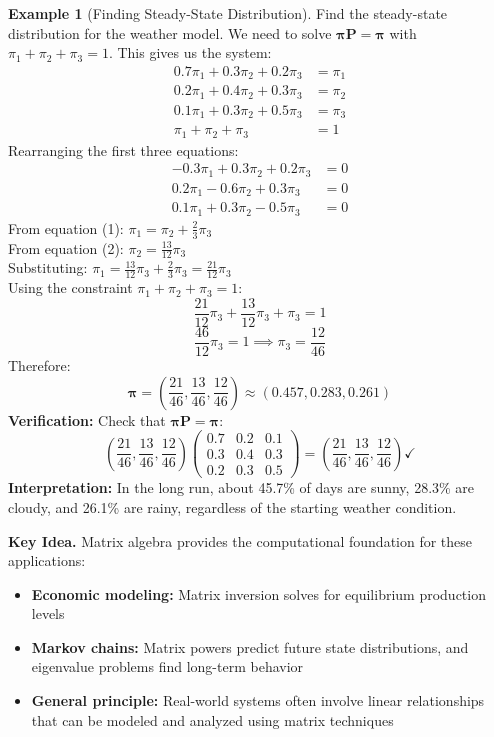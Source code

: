 \documentclass[12pt]{article}
\numberwithin{equation}{section}
\newcommand{\vect}[1]{\boldsymbol{#1}}   %
\newcommand{\mat}[1]{\mathbf{#1}}        %
\theoremstyle{plain}
\theoremstyle{definition}
\newtheorem{example}[theorem]{Example}
\theoremstyle{remark}
\newenvironment{keyidea}{\begin{tcolorbox}\textbf{Key Idea.}}{\end{tcolorbox}}
\begin{document}
\begin{example}[Finding Steady-State Distribution]
Find the steady-state distribution for the weather model.
We need to solve $\vect{\pi}\mat{P} = \vect{\pi}$ with $\pi_1 + \pi_2 + \pi_3 = 1$.
This gives us the system:
\begin{align}
0.7\pi_1 + 0.3\pi_2 + 0.2\pi_3 &= \pi_1\\
0.2\pi_1 + 0.4\pi_2 + 0.3\pi_3 &= \pi_2\\
0.1\pi_1 + 0.3\pi_2 + 0.5\pi_3 &= \pi_3\\
\pi_1 + \pi_2 + \pi_3 &= 1
\end{align}
Rearranging the first three equations:
\begin{align}
-0.3\pi_1 + 0.3\pi_2 + 0.2\pi_3 &= 0\\
0.2\pi_1 - 0.6\pi_2 + 0.3\pi_3 &= 0\\
0.1\pi_1 + 0.3\pi_2 - 0.5\pi_3 &= 0
\end{align}
From equation (1): $\pi_1 = \pi_2 + \frac{2}{3}\pi_3$\\
From equation (2): $\pi_2 = \frac{13}{12}\pi_3$\\
Substituting: $\pi_1 = \frac{13}{12}\pi_3 + \frac{2}{3}\pi_3 = \frac{21}{12}\pi_3$\\
Using the constraint $\pi_1 + \pi_2 + \pi_3 = 1$:
$$\frac{21}{12}\pi_3 + \frac{13}{12}\pi_3 + \pi_3 = 1$$
$$\frac{46}{12}\pi_3 = 1 \implies \pi_3 = \frac{12}{46}$$
Therefore:
$$\vect{\pi} = \left(\frac{21}{46}, \frac{13}{46}, \frac{12}{46}\right) \approx (0.457, 0.283, 0.261)$$
\textbf{Verification:} Check that $\vect{\pi}\mat{P} = \vect{\pi}$:
$$\left(\frac{21}{46}, \frac{13}{46}, \frac{12}{46}\right) \begin{pmatrix}
0.7 & 0.2 & 0.1 \\
0.3 & 0.4 & 0.3 \\
0.2 & 0.3 & 0.5
\end{pmatrix} = \left(\frac{21}{46}, \frac{13}{46}, \frac{12}{46}\right) \checkmark$$
\textbf{Interpretation:} In the long run, about 45.7\% of days are sunny, 28.3\% are cloudy, and 26.1\% are rainy, regardless of the starting weather condition.
\end{example}

\begin{keyidea}
Matrix algebra provides the computational foundation for these applications:
\begin{itemize}
\item \textbf{Economic modeling:} Matrix inversion solves for equilibrium production levels
\item \textbf{Markov chains:} Matrix powers predict future state distributions, and eigenvalue problems find long-term behavior
\item \textbf{General principle:} Real-world systems often involve linear relationships that can be modeled and analyzed using matrix techniques
\end{itemize}
\end{keyidea}
\end{document}
